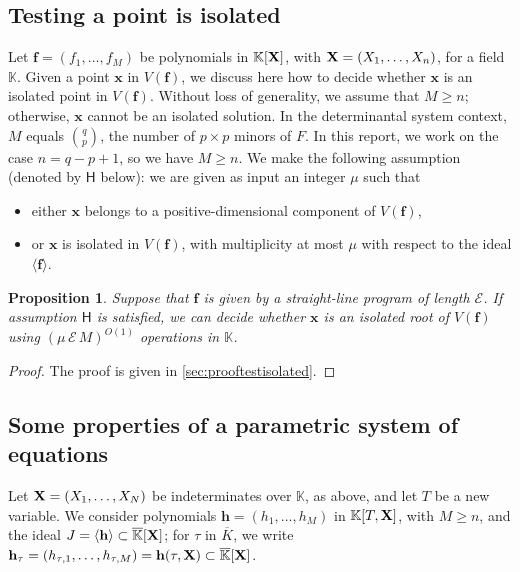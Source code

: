 \documentclass[11pt]{article}
\numberwithin{Property}{section}
\numberwithin{Theorem}{section}
\newtheorem{Proposition}{Proposition}%
\numberwithin{Proposition}{section}
\numberwithin{Lemma}{section}
\numberwithin{Corollary}{section}
\numberwithin{Definition}{section}
\numberwithin{Remark}{section}
\numberwithin{Conjecture}{section}
\numberwithin{Problem}{section}
\numberwithin{Claim}{section}
\theoremstyle{definition}
\numberwithin{Example}{section}
\renewcommand{\ge}{\geqslant}
\def\bar{\overline}
\renewcommand{\ge}{\geqslant} %
\newcommand{\field}{\mathbb{K}} %
\newcommand{\mat}[1]{\mathbf{\MakeUppercase{#1}}} %
\newcommand{\improve}[1]{\textcolor{blue}{#1}} %
\begin{document}
\subsection{Testing a point is isolated}
\label{subsec:isolated}
Let $\mathbf{f}=(f_1,\dots,f_M)$ be polynomials in $\field[\mat{X}]$, with $\mat{X}=(X_1,\dots,X_n)$, for a field $\field$. Given a point $\mathbf{x}$ in $V(\mathbf{f})$, we discuss here how to decide whether $\mathbf{x}$ is an isolated point in $V(\mathbf{f})$. Without loss of generality, we assume that $M\ge n$; otherwise, $\mathbf{x}$
cannot be an isolated solution. In the determinantal system context, $M$ equals ${q \choose p}$, the number of $p\times p$ minors of $F$. In this report, we work on the case $n = q-p+1$, so we have $M \ge n$. We make the following assumption (denoted by $\mathsf{H}$ below): we are given as input an integer $\mu$ such that
\begin{itemize}
\item either $\mathbf{x}$ belongs to a positive-dimensional component of $V(\mathbf{f})$,
\item or $\mathbf{x}$ is isolated in $V(\mathbf{f})$, with multiplicity at most $\mu$
  with respect to the ideal $\langle \mathbf{f} \rangle$.
\end{itemize}

\begin{Proposition}\label{testisolated} Suppose that $\mathbf{f}$ is given by a straight-line program of length $\mathcal{E}$. If assumption $\mathsf{H}$ is satisfied, we can decide whether $\mathbf{x}$ is an isolated root of $V(\mathbf{f})$ using $(\mu \,\mathcal{E} \,M)^{O(1)}$ operations in $\field$.
\end{Proposition}
\begin{proof}
The proof is given in \improve{\cref{sec:prooftestisolated}}. 
\end{proof}
\subsection{Some properties of a parametric system of equations}
Let $\mat{X}=(X_1,\dots,X_N)$ be indeterminates over $\field$, as above, and let $T$ be a new variable. We consider polynomials $\mathbf{h}=(h_1,\dots,h_M)$ in $\field[T,\mat{X}]$, with $M \ge n$, and the ideal $J=\langle \mathbf{h} \rangle \subset \bar{\field}[\mat{X}]$; for $\tau$ in $\bar{K}$, we write $\mathbf{h}_\tau=(h_{\tau,1},\dots,h_{\tau,M})=\mathbf{h}(\tau,\mat{X})\subset \bar{\field}[\mat{X}]$. 
\end{document}
